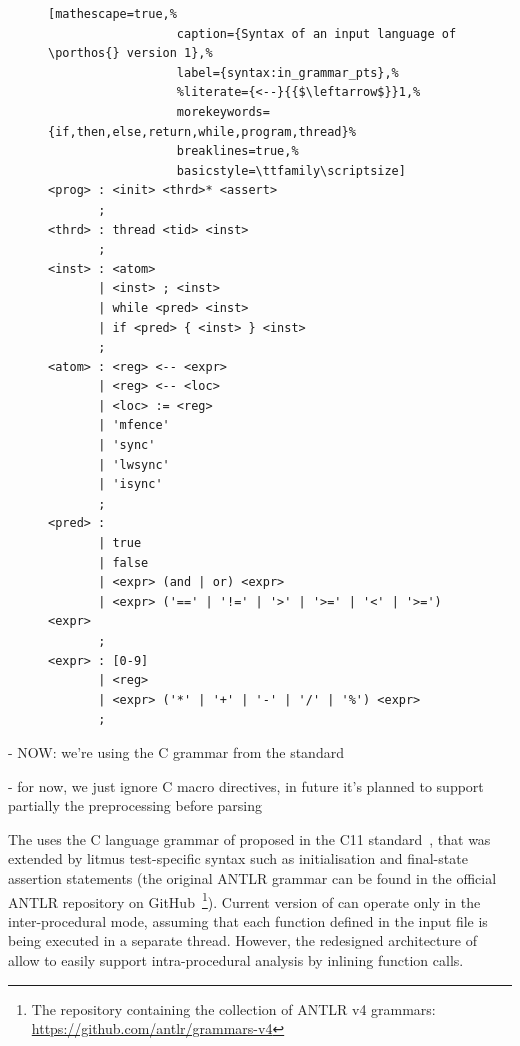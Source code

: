 


\begin{figure}%
\begin{lstlisting}[mathescape=true,%
                  caption={Syntax of an input language of \porthos{} version 1},%
                  label={syntax:in_grammar_pts},%
                  %literate={<--}{{$\leftarrow$}}1,%
                  morekeywords={if,then,else,return,while,program,thread}%
                  breaklines=true,%
                  basicstyle=\ttfamily\scriptsize]
<prog> : <init> <thrd>* <assert>
       ;
<thrd> : thread <tid> <inst>
       ;
<inst> : <atom>
       | <inst> ; <inst>
       | while <pred> <inst>
       | if <pred> { <inst> } <inst>
       ;
<atom> : <reg> <-- <expr>
       | <reg> <-- <loc>
       | <loc> := <reg>
       | 'mfence'
       | 'sync'
       | 'lwsync'
       | 'isync'
       ;
<pred> :
       | true
       | false
       | <expr> (and | or) <expr>
       | <expr> ('==' | '!=' | '>' | '>=' | '<' | '>=') <expr>
       ;
<expr> : [0-9]
       | <reg>
       | <expr> ('*' | '+' | '-' | '/' | '%') <expr>
       ;
\end{lstlisting}
\end{figure}


- NOW: we're using the C grammar from the standard

- for now, we just ignore C macro directives, in future it's planned to support partially the preprocessing before parsing

The \porthos[2] uses the C language grammar of proposed in the C11 standard~\cite{jtc2011sc22}, that was extended by litmus test-specific syntax such as initialisation and final-state assertion statements (the original ANTLR grammar can be found in the official ANTLR repository on GitHub~\footnote{The repository containing the collection of ANTLR v4 grammars:\\ \url{https://github.com/antlr/grammars-v4}}).
Current version of \porthos[2] can operate only in the inter-procedural mode, assuming that each function defined in the input file is being executed in a separate thread.
However, the redesigned architecture of \porthos[2] allow to easily support intra-procedural analysis by inlining function calls.

